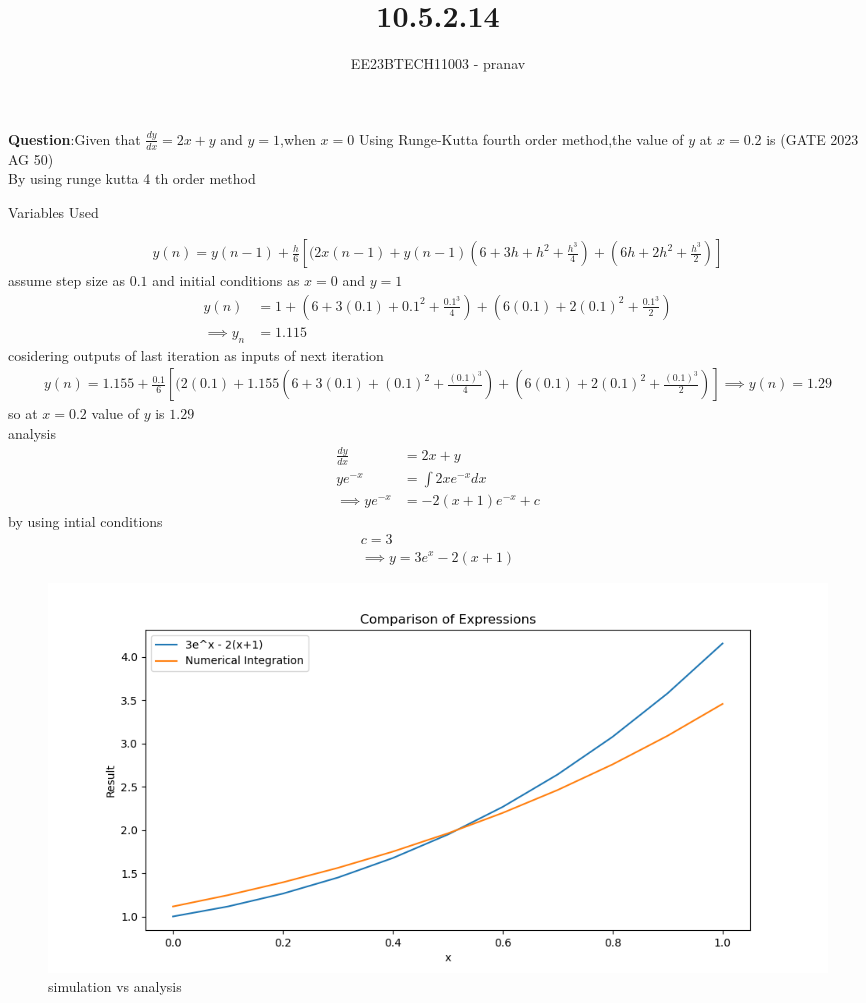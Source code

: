\documentclass[journal,12pt,twocolumn]{IEEEtran}
\theoremstyle{remark}
\begin{document}

\vspace{3cm}

\title{10.5.2.14}
\author{EE23BTECH11003 - pranav}
\maketitle
\newpage

\bigskip
\renewcommand{\thefigure}{\arabic{figure}}
\renewcommand{\thetable}{\arabic{table}}

\textbf{Question}:Given that $\frac{dy}{dx}=2x+y$ and $y=1$,when $x=0$ Using Runge-Kutta fourth order method,the value of $y$ at $x=0.2$ is \hfill(GATE 2023 AG 50) 
\solution\\
By using runge kutta 4 th order method\\
\begin{table}[h]
    \centering
    
    \caption{Variables Used}
    \label{ag:50}
\end{table}
\begin{align}
y(n)=y(n-1)+\frac{h}{6}[(2x(n-1)+y(n-1)(6+3h+h^2+\frac{h^3}{4})+(6h+2h^2+\frac{h^3}{2})]
\end{align}
assume step size as $0.1$ and initial conditions as $x=0$ and $y=1$\\
\begin{align}
y(n)&=1+(6+3(0.1)+0.1^2+\frac{0.1^3}{4})+(6(0.1)+2(0.1)^2+\frac{0.1^3}{2})\\
\implies y_{n}&=1.115
\end{align}
cosidering outputs of last iteration as inputs of next iteration\\
\begin{align}
y(n)=1.155+\frac{0.1}{6}[(2(0.1)+1.155(6+3(0.1)+(0.1)^2+\frac{(0.1)^3}{4})+(6(0.1)+2(0.1)^2+\frac{(0.1)^3}{2})]
\implies y(n)=1.29
\end{align}
so at $x=0.2$ value of $y$ is $1.29$\\
analysis
\begin{align}
\frac{dy}{dx}&=2x+y\\
ye^{-x}&=\int2xe^{-x}dx\\
\implies ye^{-x}&=-2(x+1)e^{-x}+c
\end{align}
by using intial conditions
\begin{align}
c=3\\
\implies y=3e^x-2(x+1)
\end{align}
\newpage
\begin{figure}
    \centering
    \includegraphics[width=1.1\linewidth]{figs/grap.png}
    \caption{simulation vs analysis}
\end{figure}
\end{document}
